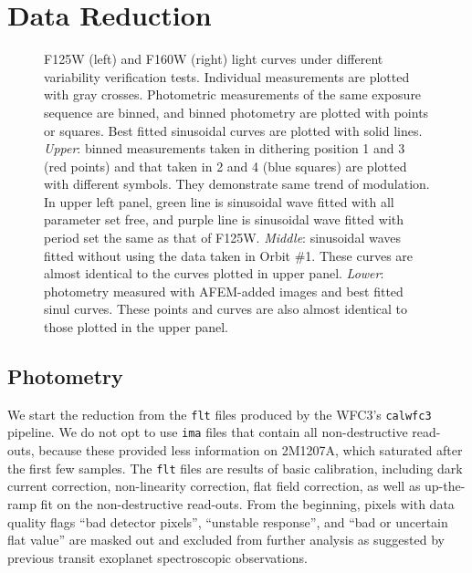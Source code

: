 \documentclass[apj]{emulateapj}
\newcommand{\ima}{\texttt{ima} files }
\newcommand{\flt}{\texttt{flt} files }
\begin{document}
\section{Data Reduction}

 \begin{figure}
  \centering
  \caption{F125W (left) and F160W (right) light curves under different
    variability verification tests. Individual measurements are
    plotted with gray crosses. Photometric measurements of the same exposure
    sequence are binned, and binned photometry are plotted with points
    or squares. Best fitted sinusoidal curves are plotted with solid
    lines. {\em Upper}: binned measurements taken in dithering
    position 1 and 3 (red points) and that taken in 2 and 4 (blue
    squares) are plotted with different symbols. They demonstrate same
    trend of modulation. In upper left panel, green line is sinusoidal
    wave fitted with all parameter set free, and purple line is
    sinusoidal wave fitted with period set the same as that of
    F125W. {\em Middle}: sinusoidal waves fitted without using the
    data taken in Orbit \#1. These curves are almost identical to the
    curves plotted in upper panel. {\em Lower}: photometry measured
    with AFEM-added images and best fitted sinul curves. These
    points and curves are also almost identical to those plotted
    in the upper panel.}
  \label{fig:2}
\end{figure}

\subsection{Photometry}

We start the reduction from the \flt{} produced by the WFC3's
\texttt{calwfc3} pipeline. We do not opt to use \ima{} that contain
all non-destructive read-outs, because these provided less information
on 2M1207A, which saturated after the first few samples.  The \flt{}
are results of basic calibration, including dark current correction,
non-linearity correction, flat field correction, as well as
up-the-ramp fit on the non-destructive read-outs. From the beginning,
pixels with data quality flags ``bad detector pixels'', ``unstable
response'', and ``bad or uncertain flat value'' are masked out and
excluded from further analysis as suggested by previous transit
exoplanet spectroscopic observations\citep[e.g.][]{Berta2012,
  Kreidberg2014}.
\end{document}
